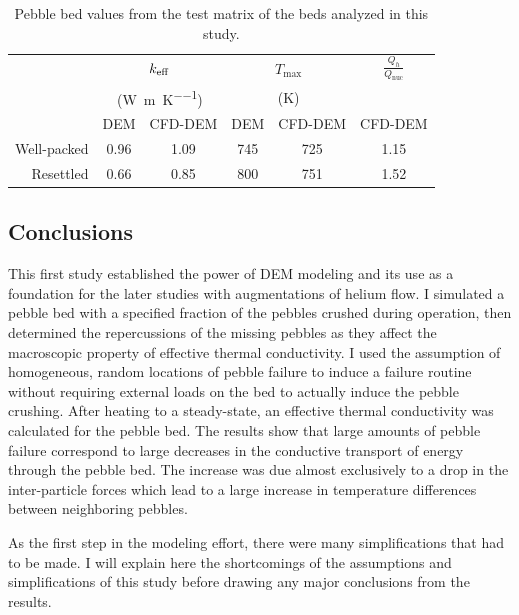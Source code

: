 \begin {table}[htp] %
\caption{Pebble bed values from the test matrix of the beds analyzed in this study.}
\label {tab:cfdem-keff} \centering %
\begin {tabular}{ rccccc }
\toprule %
			& 	\multicolumn{2}{c}{$k_\text{eff}$}	&   \multicolumn{2}{c}{$T_\text{max}$}	&	$\frac{Q_h}{Q_\text{nuc}}$		\\
			& 	\multicolumn{2}{c}{(\si{\watt\per\meter\per\kelvin})}			&	\multicolumn{2}{c}{(\si{\kelvin})}				&									\\
			& 	DEM 		& 	CFD-DEM				&	DEM 		& 	CFD-DEM 			& 	CFD-DEM							\\\toprule
Well-packed	& 	0.96		& 	1.09				& 	745			& 	725					& 	1.15							\\
Resettled	& 	0.66		& 	0.85				& 	800			& 	751					& 	1.52							\\\bottomrule
\end{tabular}
\end{table}





\FloatBarrier



\subsection{Conclusions}
\label{sec:dem-conclusions}
This first study established the power of DEM modeling and its use as a foundation for the later studies with augmentations of helium flow. I simulated a pebble bed with a specified fraction of the pebbles crushed during operation, then determined the repercussions of the missing pebbles as they affect the macroscopic property of effective thermal conductivity. I used the assumption of homogeneous, random locations of pebble failure to induce a failure routine without requiring external loads on the bed to actually induce the pebble crushing. After heating to a steady-state, an effective thermal conductivity was calculated for the pebble bed. The results show that large amounts of pebble failure correspond to large decreases in the conductive transport of energy through the pebble bed. The increase was due almost exclusively to a drop in the inter-particle forces which lead to a large increase in temperature differences between neighboring pebbles.

As the first step in the modeling effort, there were many simplifications that had to be made. I will explain here the shortcomings of the assumptions and simplifications of this study before drawing any major conclusions from the results.

